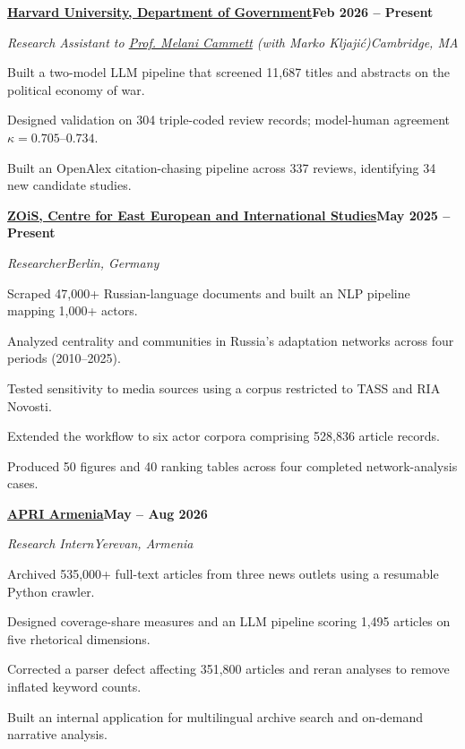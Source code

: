 \documentclass[11pt]{article}
\newcommand{\cventry}[5][5\baselineskip]{%
  \Needspace{#1}%
  \vspace{2pt}%
  {\textbf{#2}\hfill\textbf{#3}\par}%
  {\textit{#4}\hfill\textit{#5}\par}%
}
\newcommand{\lnCammett}{https://sites.harvard.edu/melanicammett}
\newcommand{\lnZois}{https://www.zois-berlin.de/en/}
\newcommand{\lnGovernment}{https://www.gov.harvard.edu/}
\newcommand{\lnAPRI}{https://apri.institute/}
\begin{document}
\cventry{\href{\lnGovernment}{Harvard University, Department of Government}}{Feb 2026 -- Present}
        {Research Assistant to \href{\lnCammett}{Prof. Melani Cammett} (with Marko Kljajić)}{Cambridge, MA}
\begin{tight}
  \item Built a two-model LLM pipeline that screened 11{,}687 titles and abstracts on the political economy of war.
  \item Designed validation on 304 triple-coded review records; model-human agreement $\kappa = 0.705$--$0.734$.
  \item Built an OpenAlex citation-chasing pipeline across 337 reviews, identifying 34 new candidate studies.
\end{tight}

\cventry{\href{\lnZois}{ZOiS, Centre for East European and International Studies}}{May 2025 -- Present}
        {Researcher}{Berlin, Germany}
\begin{tight}
  \item Scraped 47{,}000+ Russian-language documents and built an NLP pipeline mapping 1{,}000+ actors.
  \item Analyzed centrality and communities in Russia's adaptation networks across four periods (2010--2025).
  \item Tested sensitivity to media sources using a corpus restricted to TASS and RIA Novosti.
  \item Extended the workflow to six actor corpora comprising 528{,}836 article records.
  \item Produced 50 figures and 40 ranking tables across four completed network-analysis cases.
\end{tight}

\cventry{\href{\lnAPRI}{APRI Armenia}}{May -- Aug 2026}
        {Research Intern}{Yerevan, Armenia}
\begin{tight}
  \item Archived 535{,}000+ full-text articles from three news outlets using a resumable Python crawler.
  \item Designed coverage-share measures and an LLM pipeline scoring 1{,}495 articles on five rhetorical dimensions.
  \item Corrected a parser defect affecting 351{,}800 articles and reran analyses to remove inflated keyword counts.
  \item Built an internal application for multilingual archive search and on-demand narrative analysis.
\end{tight}
\end{document}
